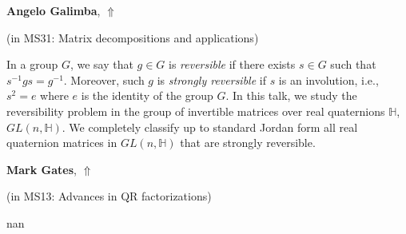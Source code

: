 \documentclass[ILAS2025-program.tex]{subfiles}
\begin{document}
     \hypertarget{down0274}{}\begin{ilasabstract}
    
    \textbf{Angelo Galimba},  \hfill \hyperlink{up0274}{$\Uparrow$}
    
    (in {\color{mstitle}MS31: Matrix decompositions and applications})
        
        \mtskip
    In a group $G$, we say that $g \in G$ is \emph{reversible} if there exists $s \in G$ such that $s^{-1}gs = g^{-1}$. Moreover, such $g$ is \emph{strongly reversible} if $s$ is an involution, i.e., $s^2 = e$ where $e$ is the identity of the group $G$. In this talk, we study the reversibility problem in the group of invertible matrices over real quaternions $\mathbb{H}$, $GL(n, \mathbb{H})$. We completely classify up to standard Jordan form all real quaternion matrices in $GL(n,\mathbb{H})$ that are strongly reversible.\end{ilasabstract}
     \hypertarget{down0341}{}\begin{ilasabstract}
    
    \textbf{Mark Gates},  \hfill \hyperlink{up0341}{$\Uparrow$}
    
    (in {\color{mstitle}MS13: Advances in QR factorizations})
        
        \mtskip
    nan\end{ilasabstract}
\end{document}
